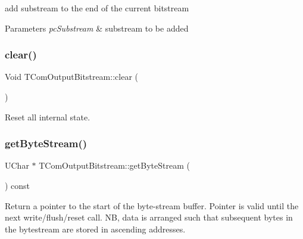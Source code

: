 \begin{DoxyItemize}
\item add substream to the end of the current bitstream
\end{DoxyItemize}
\begin{DoxyParams}{Parameters}
{\em pc\+Substream} & substream to be added \\
\hline
\end{DoxyParams}
\mbox{\label{class_t_com_output_bitstream_a7eef394424aa099a7e93a184163620de}} 
\subsubsection{\texorpdfstring{clear()}{clear()}}
{\footnotesize\ttfamily Void T\+Com\+Output\+Bitstream\+::clear (\begin{DoxyParamCaption}{ }\end{DoxyParamCaption})}

Reset all internal state. \mbox{\label{class_t_com_output_bitstream_a5cad8768ff2ebd63d447500bd1d67848}} 
\subsubsection{\texorpdfstring{get\+Byte\+Stream()}{getByteStream()}}
{\footnotesize\ttfamily U\+Char $\ast$ T\+Com\+Output\+Bitstream\+::get\+Byte\+Stream (\begin{DoxyParamCaption}{ }\end{DoxyParamCaption}) const}

Return a pointer to the start of the byte-\/stream buffer. Pointer is valid until the next write/flush/reset call. NB, data is arranged such that subsequent bytes in the bytestream are stored in ascending addresses. \mbox{\label{class_t_com_output_bitstream_af38a55f59d7cf832844961a9a2d3ff5a}} 
